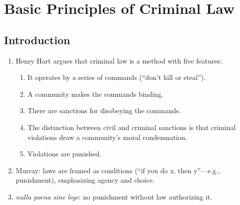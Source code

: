 \section{Basic Principles of Criminal Law}

\subsection{Introduction}

\begin{enumerate}
    \item Henry Hart argues that criminal law is a method with five features:
    \begin{enumerate}
        \item It operates by a series of commands (``don't kill or steal'').
        \item A community makes the commands binding.
        \item There are sanctions for disobeying the commands.
        \item The distinction between civil and criminal sanctions is that criminal violations draw a community's moral condemnation.
        \item Violations are punished.
    \end{enumerate}
    \item Murray: laws are framed as conditions (``if you do x, then y''---e.g., punishment), emphasizing agency and choice.
    \item \emph{nulla poena sine lege}: no punishment without law authorizing it.


\end{enumerate}
